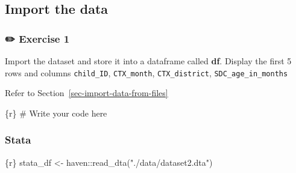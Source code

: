 \documentclass[
  letterpaper,
  DIV=11,
  numbers=noendperiod,
  oneside]{scrreprt}
\newenvironment{Shaded}{\begin{snugshade}}{\end{snugshade}}
\newcommand{\CommentTok}[1]{\textcolor[rgb]{0.37,0.37,0.37}{#1}}
\newcommand{\FunctionTok}[1]{\textcolor[rgb]{0.28,0.35,0.67}{#1}}
\newcommand{\InformationTok}[1]{\textcolor[rgb]{0.37,0.37,0.37}{#1}}
\newcommand{\NormalTok}[1]{\textcolor[rgb]{0.00,0.23,0.31}{#1}}
\newcommand{\OtherTok}[1]{\textcolor[rgb]{0.00,0.23,0.31}{#1}}
\newcommand{\SpecialCharTok}[1]{\textcolor[rgb]{0.37,0.37,0.37}{#1}}
\newcommand{\StringTok}[1]{\textcolor[rgb]{0.13,0.47,0.30}{#1}}
\begin{document}
\hypertarget{import-the-data}{%
\subsection{Import the data}\label{import-the-data}}

\subsubsection{\texorpdfstring{{✏️} Exercise 1}{✏️ Exercise 1}}

Import the dataset and store it into a dataframe called \textbf{df}.
Display the first 5 rows and columns \texttt{child\_ID},
\texttt{CTX\_month}, \texttt{CTX\_district},
\texttt{SDC\_age\_in\_months}

\begin{tcolorbox}[enhanced jigsaw, coltitle=black, opacityback=0, title=\textcolor{quarto-callout-tip-color}{\faLightbulb}\hspace{0.5em}{Tip}, toprule=.15mm, bottomtitle=1mm, colbacktitle=quarto-callout-tip-color!10!white, colframe=quarto-callout-tip-color-frame, left=2mm, opacitybacktitle=0.6, bottomrule=.15mm, arc=.35mm, toptitle=1mm, colback=white, titlerule=0mm, breakable, leftrule=.75mm, rightrule=.15mm]

Refer to Section~\ref{sec-import-data-from-files}

\end{tcolorbox}

\begin{Shaded}
\begin{Highlighting}[]
\InformationTok{\textasciigrave{}\textasciigrave{}\textasciigrave{}\{r\}}
\CommentTok{\# Write your code here}
\InformationTok{\textasciigrave{}\textasciigrave{}\textasciigrave{}}
\end{Highlighting}
\end{Shaded}

\subsubsection{Stata}

\begin{Shaded}
\begin{Highlighting}[]
\InformationTok{\textasciigrave{}\textasciigrave{}\textasciigrave{}\{r\}}
\NormalTok{stata\_df }\OtherTok{\textless{}{-}}\NormalTok{ haven}\SpecialCharTok{::}\FunctionTok{read\_dta}\NormalTok{(}\StringTok{"./data/dataset2.dta"}\NormalTok{)}
\InformationTok{\textasciigrave{}\textasciigrave{}\textasciigrave{}}
\end{Highlighting}
\end{Shaded}
\end{document}
